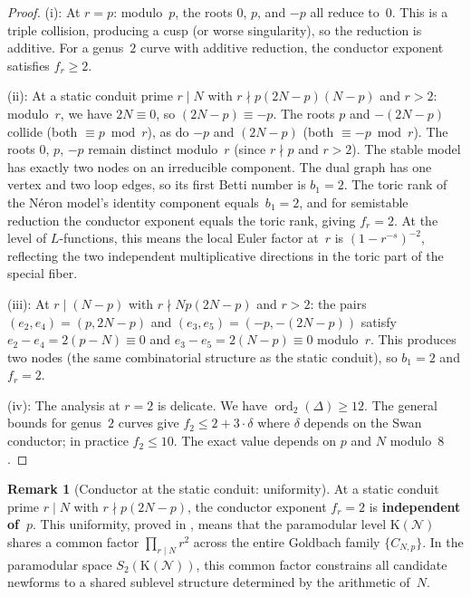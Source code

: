 \documentclass[11pt,a4paper]{article}
\theoremstyle{definition}
\newtheorem{remark}[theorem]{Remark}
\DeclareMathOperator{\ord}{ord}
\begin{document}
\begin{proof}
(i): At $r = p$: modulo~$p$, the roots $0$, $p$, and $-p$ all reduce to~$0$. This is a triple collision, producing a cusp (or worse singularity), so the reduction is additive. For a genus~$2$ curve with additive reduction, the conductor exponent satisfies $f_r \ge 2$.

(ii): At a static conduit prime $r \mid N$ with $r \nmid p(2N-p)(N-p)$ and $r > 2$: modulo~$r$, we have $2N \equiv 0$, so $(2N-p) \equiv -p$. The roots $p$ and $-(2N-p)$ collide (both $\equiv p \bmod r$), as do $-p$ and $(2N-p)$ (both $\equiv -p \bmod r$). The roots $0$, $p$, $-p$ remain distinct modulo~$r$ (since $r \nmid p$ and $r > 2$). The stable model has exactly two nodes on an irreducible component. The dual graph has one vertex and two loop edges, so its first Betti number is $b_1 = 2$. The toric rank of the N\'{e}ron model's identity component equals~$b_1 = 2$, and for semistable reduction the conductor exponent equals the toric rank, giving $f_r = 2$. At the level of $L$-functions, this means the local Euler factor at~$r$ is $(1 - r^{-s})^{-2}$, reflecting the two independent multiplicative directions in the toric part of the special fiber.

(iii): At $r \mid (N-p)$ with $r \nmid Np(2N-p)$ and $r > 2$: the pairs $(e_2, e_4) = (p, 2N-p)$ and $(e_3, e_5) = (-p, -(2N-p))$ satisfy $e_2 - e_4 = 2(p-N) \equiv 0$ and $e_3 - e_5 = 2(N-p) \equiv 0$ modulo~$r$. This produces two nodes (the same combinatorial structure as the static conduit), so $b_1 = 2$ and $f_r = 2$.

(iv): The analysis at $r = 2$ is delicate. We have $\ord_2(\Delta) \ge 12$. The general bounds for genus~$2$ curves give $f_2 \le 2 + 3 \cdot \delta$ where $\delta$ depends on the Swan conductor; in practice $f_2 \le 10$. The exact value depends on $p$ and $N$ modulo~$8$. \qedhere
\end{proof}

\begin{remark}[Conductor at the static conduit: uniformity]\label{rem:uniform}
At a static conduit prime $r \mid N$ with $r \nmid p(2N-p)$, the conductor exponent $f_r = 2$ is \textbf{independent of~$p$}. This uniformity, proved in \cite{Companion7}, means that the paramodular level $\mathrm{K}(\mathcal{N})$ shares a common factor $\prod_{r \mid N} r^2$ across the entire Goldbach family $\{C_{N,p}\}$. In the paramodular space $S_2(\mathrm{K}(\mathcal{N}))$, this common factor constrains all candidate newforms to a shared sublevel structure determined by the arithmetic of~$N$.
\end{remark}
\end{document}

